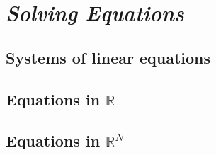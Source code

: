 
\chapter{\emph{Solving Equations}} 
\label{solvingequations}


\section{Systems of linear equations}
\section{Equations in $\mathbb{R}$}
\section{Equations in ${\mathbb{R}}^N$}
